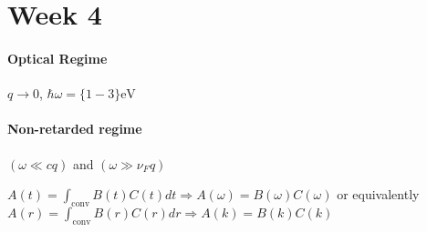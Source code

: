 \section{Week 4}\label{sec:week4}

\paragraph{Optical Regime} $q \to 0$, $\hbar \omega = \{1-3\}\mathrm{eV}$

\paragraph{Non-retarded regime} $(\omega \ll cq)$ and $(\omega \gg \nu_F q)$ 


$A(t) = \int_{\mathrm{conv}} B(t) C(t) dt \Rightarrow A(\omega) = B(\omega) C(\omega)$
or equivalently \\
$A(r) = \int_{\mathrm{conv}} B(r) C(r) dr \Rightarrow A(k) = B(k) C(k)$
